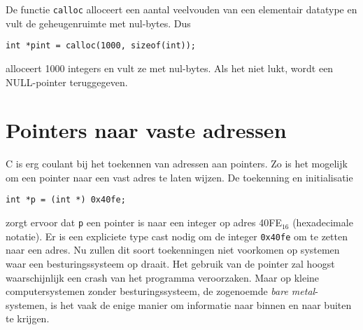 De functie \texttt{calloc} alloceert een aantal veelvouden van een elementair datatype en vult de geheugenruimte met nul-bytes. Dus

\hspace*{1em}\texttt{int *pint = calloc(1000, sizeof(int));}

alloceert 1000 integers en vult ze met nul-bytes. Als het niet lukt, wordt een NULL-pointer teruggegeven.



\advanced
\section{Pointers naar vaste adressen}
C is erg coulant bij het toekennen van adressen aan pointers. Zo is het mogelijk om een pointer naar een vast adres te laten wijzen.
De toekenning en initialisatie

\hspace*{1em}\texttt{int *p = (int *) 0x40fe;}

zorgt ervoor dat \texttt{p} een pointer is naar een integer op adres 40FE$_{16}$ (hexadecimale notatie). Er is een expliciete type cast nodig om de integer \texttt{0x40fe} om te zetten naar een adres. Nu zullen dit soort toekenningen niet voorkomen op systemen waar een besturingssysteem op draait. Het gebruik van de pointer zal hoogst waarschijnlijk een crash van het programma veroorzaken. Maar op kleine computersystemen zonder besturingssysteem, de zogenoemde \textsl{bare metal}-systemen, is het vaak de enige manier om informatie naar binnen en naar buiten te krijgen.





